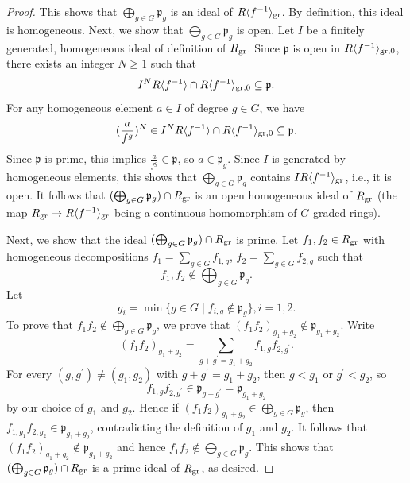 \documentclass[12pt,twoside,a4paper]{article}
\theoremstyle{definition}
\theoremstyle{remark}
\newcommand\gr{{\rm gr}}
\begin{document}
\begin{proof}
This shows that $\bigoplus_{g\in G}\mathfrak{p}_{g}$ is an ideal of $R\langle f^{-1}\rangle_{\gr}$. By definition, this ideal is homogeneous. Next, we show that $\bigoplus_{g\in G}\mathfrak{p}_{g}$ is open. Let $I$ be a finitely generated, homogeneous ideal of definition of $R_{\gr}$. Since $\mathfrak{p}$ is open in $R\langle f^{-1}\rangle_{\gr, 0}$, there exists an integer $N\geq1$ such that \begin{equation*}I^{N}R\langle f^{-1}\rangle\cap R\langle f^{-1}\rangle_{\gr, 0}\subseteq \mathfrak{p}.\end{equation*}For any homogeneous element $a\in I$ of degree $g\in G$, we have \begin{equation*}(\frac{a}{f^{g}})^{N}\in I^{N}R\langle f^{-1}\rangle\cap R\langle f^{-1}\rangle_{\gr, 0}\subseteq \mathfrak{p}.\end{equation*}Since $\mathfrak{p}$ is prime, this implies $\frac{a}{f^{g}}\in \mathfrak{p}$, so $a\in \mathfrak{p}_{g}$. Since $I$ is generated by homogeneous elements, this shows that $\bigoplus_{g\in G}\mathfrak{p}_{g}$ contains $IR\langle f^{-1}\rangle_{\gr}$, i.e., it is open. It follows that $(\bigoplus_{g\in G}\mathfrak{p}_{g})\cap R_{\gr}$ is an open homogeneous ideal of $R_{\gr}$ (the map $R_{\gr}\to R\langle f^{-1}\rangle_{\gr}$ being a continuous homomorphism of $G$-graded rings). 

Next, we show that the ideal $(\bigoplus_{g\in G}\mathfrak{p}_{g})\cap R_{\gr}$ is prime. Let $f_{1}, f_{2}\in R_{\gr}$ with homogeneous decompositions $f_{1}=\sum_{g\in G}f_{1, g}$, $f_{2}=\sum_{g\in G}f_{2, g}$ such that \begin{equation*}f_{1}, f_{2}\not\in \bigoplus_{g\in G}\mathfrak{p}_{g}.\end{equation*}Let \begin{equation*}g_{i}=\min\{g\in G\mid f_{i, g}\not\in \mathfrak{p}_{g}\}, i=1, 2.\end{equation*}
To prove that $f_{1}f_{2}\not\in \bigoplus_{g\in G}\mathfrak{p}_{g}$, we prove that $(f_{1}f_{2})_{g_{1}+g_{2}}\not\in \mathfrak{p}_{g_{1}+g_{2}}$. Write \begin{equation*}(f_{1}f_{2})_{g_{1}+g_{2}}=\sum_{g+g^{\prime}=g_{1}+g_{2}}f_{1,g}f_{2, g^{\prime}}.\end{equation*}For every $(g, g^{\prime})\neq (g_1, g_2)$ with $g+g^{\prime}=g_{1}+g_{2}$, then $g<g_{1}$ or $g^{\prime}<g_{2}$, so \begin{equation*}f_{1, g}f_{2, g^{\prime}}\in \mathfrak{p}_{g+g^{\prime}}=\mathfrak{p}_{g_{1}+g_{2}}\end{equation*}by our choice of $g_{1}$ and $g_{2}$. Hence if $(f_{1}f_{2})_{g_{1}+g_{2}}\in \bigoplus_{g\in G}\mathfrak{p}_{g}$, then $f_{1, g_{1}}f_{2, g_{2}}\in \mathfrak{p}_{g_{1}+g_{2}}$, contradicting the definition of $g_{1}$ and $g_{2}$. It follows that $(f_{1}f_{2})_{g_{1}+g_{2}}\not\in \mathfrak{p}_{g_{1}+g_{2}}$ and hence $f_{1}f_{2}\not\in \bigoplus_{g\in G}\mathfrak{p}_{g}$. This shows that $(\bigoplus_{g\in G}\mathfrak{p}_{g})\cap R_{\gr}$ is a prime ideal of $R_{\gr}$, as desired.


\end{proof}
\end{document}

